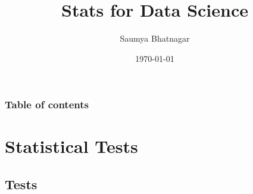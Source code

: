 \documentclass{beamer}
\begin{document}
	\title{Stats for Data Science}  
	\author{Saumya Bhatnagar}
	\date{\today} 
	
	
\begin{frame}
\titlepage
\end{frame}

\begin{frame}\frametitle{Table of contents}\tableofcontents
\end{frame} 


\section{Statistical Tests}


\subsection{Tests}
\end{document}
